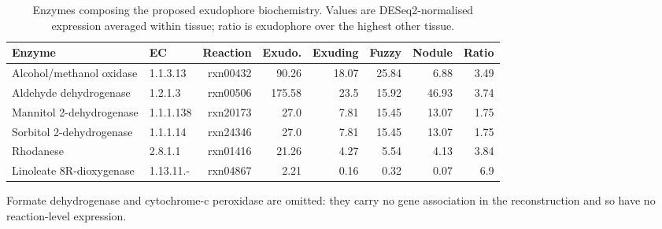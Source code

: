 \begin{table}[htbp]
\caption{Enzymes composing the proposed exudophore biochemistry. Values are DESeq2-normalised expression averaged within tissue; ratio is exudophore over the highest other tissue.}\label{tab:enzymes}
\footnotesize
\begin{tabular}{@{}llrrrrrr@{}}
\toprule
Enzyme & EC & Reaction & Exudo. & Exuding & Fuzzy & Nodule & Ratio \\
\midrule
Alcohol/methanol oxidase & 1.1.3.13 & rxn00432 & 90.26 & 18.07 & 25.84 & 6.88 & 3.49 \\
Aldehyde dehydrogenase & 1.2.1.3 & rxn00506 & 175.58 & 23.5 & 15.92 & 46.93 & 3.74 \\
Mannitol 2-dehydrogenase & 1.1.1.138 & rxn20173 & 27.0 & 7.81 & 15.45 & 13.07 & 1.75 \\
Sorbitol 2-dehydrogenase & 1.1.1.14 & rxn24346 & 27.0 & 7.81 & 15.45 & 13.07 & 1.75 \\
Rhodanese & 2.8.1.1 & rxn01416 & 21.26 & 4.27 & 5.54 & 4.13 & 3.84 \\
Linoleate 8R-dioxygenase & 1.13.11.- & rxn04867 & 2.21 & 0.16 & 0.32 & 0.07 & 6.9 \\
\bottomrule
\end{tabular}
\begin{tablenotes}[flushleft]\footnotesize\item Formate dehydrogenase and cytochrome-c peroxidase are omitted: they carry no gene association in the reconstruction and so have no reaction-level expression.\end{tablenotes}
\end{table}
